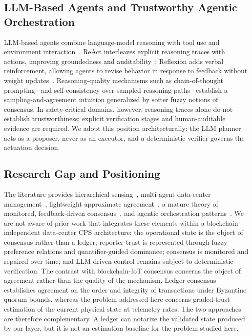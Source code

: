 \documentclass[smartcities,article,submit,moreauthors]{Definitions/mdpi}
\begin{document}
\subsection{LLM-Based Agents and Trustworthy Agentic Orchestration}
\label{sec:related_llm}

LLM-based agents combine language-model reasoning with tool use and
environment interaction~\cite{wang2024agents}. ReAct interleaves
explicit reasoning traces with actions, improving groundedness and
auditability~\cite{yao2023react}; Reflexion adds verbal reinforcement,
allowing agents to revise behavior in response to feedback without weight
updates~\cite{shinn2023reflexion}. Reasoning-quality mechanisms such as
chain-of-thought prompting~\cite{wei2022cot} and self-consistency over
sampled reasoning paths~\cite{wang2023selfconsistency} establish a
sampling-and-agreement intuition generalized by softer fuzzy notions of
consensus. In safety-critical domains, however, reasoning traces alone do
not establish trustworthiness; explicit verification stages and
human-auditable evidence are required. We adopt this position
architecturally: the LLM planner acts as a proposer, never as an
executor, and a deterministic verifier governs the actuation decision.

\subsection{Research Gap and Positioning}
\label{sec:positioning}

The literature provides hierarchical sensing~\cite{jiang2019,
yan2021}, multi-agent data-center management~\cite{das2008,tesauro2004},
lightweight approximate agreement~\cite{zhang2021approx}, a mature
theory of monitored, feedback-driven consensus~\cite{herreraviedma2014},
and agentic orchestration patterns~\cite{yao2023react,shinn2023reflexion}.
We are not aware of prior work that integrates these elements within a
blockchain-independent data-center CPS architecture: the operational state
is the object of consensus rather than a ledger; reporter trust is
represented through fuzzy preference relations and quantifier-guided
dominance; consensus is monitored and repaired over time; and LLM-driven
control remains subject to deterministic verification. The contrast with
blockchain-IoT consensus concerns the object of agreement rather than the
quality of the mechanism. Ledger consensus establishes agreement on the
order and integrity of transactions under Byzantine quorum bounds,
whereas the problem addressed here concerns graded-trust estimation of the
current physical state at telemetry rates. The two approaches are
therefore complementary. A ledger can notarize the validated state
produced by our layer, but it is not an estimation baseline for the
problem studied here.
\end{document}
